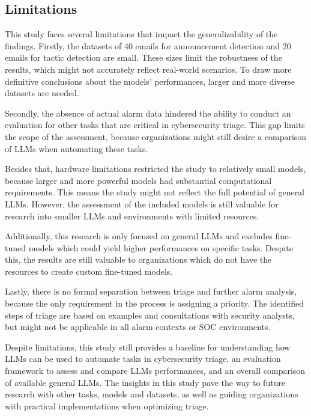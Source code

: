 \subsection{Limitations}
\label{subsec:limitations}

This study faces several limitations that impact the generalizability of the findings.
Firstly, the datasets of 40 emails for announcement detection and 20 emails for tactic detection are small.
These sizes limit the robustness of the results, which might not accurately reflect real-world scenarios.
To draw more definitive conclusions about the models' performances, larger and more diverse datasets are needed.

Secondly, the absence of actual alarm data hindered the ability to conduct an evaluation for other tasks that are
critical in cybersecurity triage.
This gap limits the scope of the assessment, because organizations might still desire a comparison of LLMs when
automating these tasks.

Besides that, hardware limitations restricted the study to relatively small models, because larger and more powerful
models had substantial computational requirements.
This means the study might not reflect the full potential of general LLMs.
However, the assessment of the included models is still valuable for research into smaller LLMs and environments with
limited resources.

Additionally, this research is only focused on general LLMs and excludes fine-tuned models which could yield higher
performances on specific tasks.
Despite this, the results are still valuable to organizations which do not have the resources to create custom
fine-tuned models.

Lastly, there is no formal separation between triage and further alarm analysis, because the only requirement in the
process is assigning a priority.
The identified steps of triage are based on examples and consultations with security analysts, but might not be
applicable in all alarm contexts or SOC environments.

Despite limitations, this study still provides a baseline for understanding how LLMs can be used to automate tasks in
cybersecurity triage, an evaluation framework to assess and compare LLMs performances, and an overall comparison of
available general LLMs.
The insights in this study pave the way to future research with other tasks, models and datasets, as well as guiding
organizations with practical implementations when optimizing triage.

